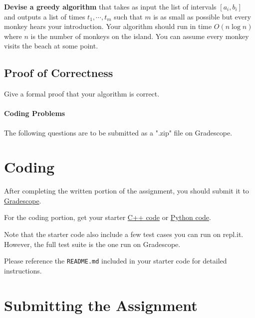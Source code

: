 \documentclass [12pt]{article}
\begin{document}
\textbf{Devise a greedy algorithm} that takes as input the list of intervals $[a_i, b_i]$ and outputs a list of times $t_1,\cdots,t_m$ such that $m$ is as small as possible but every monkey hears your introduction. Your algorithm should run in time $O(n \log n)$ where $n$ is the number of monkeys on the island. You can assume every monkey visits the beach at some point. 



\subsection{Proof of Correctness } Give a formal proof that your algorithm is correct. 

\pagebreak
\begin{Instruction}

\paragraph{Coding Problems} The following questions are to be submitted as a ".zip" file on Gradescope. 

\end{Instruction}

\section{Coding }
After completing the written portion of the assignment, you should submit it to \href{https://www.gradescope.com/courses/350304}{Gradescope}.

For the coding portion, get your starter \href{https://replit.com/team/COMP285/HW9-Code}{C++ code} or \href{https://replit.com/team/COMP285/HW9-Code-Python}{Python code}.

Note that the starter code also include a few test cases you can run on repl.it. However, the full test suite is the one run on Gradescope.

Please reference the \texttt{README.md} included in your starter code for detailed instructions.

\section*{Submitting the Assignment}
\end{document}
